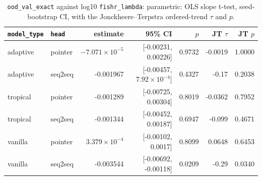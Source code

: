 \documentclass[10pt]{article}
\begin{document}
{\small
\begin{longtable}{llrrrrr}
\caption{\texttt{ood\_val\_exact} against log10 \texttt{fishr\_lambda}: parametric: OLS slope t-test, seed-bootstrap CI, with the Jonckheere--Terpstra ordered-trend $\tau$ and $p$.}\label{tab:trend-ood_val_exact}\\
\toprule
\texttt{model\_type} & \texttt{head} & estimate & 95\% CI & $p$ & JT $\tau$ & JT $p$\\
\midrule
\endhead
adaptive & pointer & $-7.071\times10^{-5}$ & [-0.00231, 0.00226] & 0.9732 & -0.0019 & 1.0000\\
adaptive & seq2seq & -0.001967 & [-0.00457, $7.92\times10^{-4}$] & 0.4327 & -0.17 & 0.2038\\
tropical & pointer & -0.001289 & [-0.00725, 0.00304] & 0.8019 & -0.0362 & 0.7952\\
tropical & seq2seq & -0.001344 & [-0.00452, 0.00187] & 0.6947 & -0.099 & 0.4671\\
vanilla & pointer & $3.379\times10^{-4}$ & [-0.00102, 0.0017] & 0.8099 & 0.0648 & 0.6453\\
vanilla & seq2seq & -0.003544 & [-0.00692, -0.00118] & 0.0209 & -0.29 & 0.0340\\
\bottomrule
\end{longtable}
}
\end{document}
